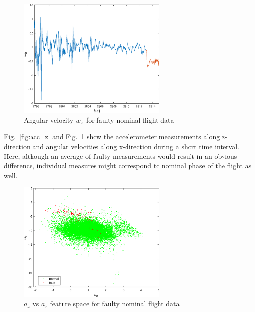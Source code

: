 \begin{figure}
\begin{center}
\includegraphics[width=0.65\textwidth]{figures/gyro_x}    %
\caption{Angular velocity $w_x$  for faulty nominal flight data} 
\label{fig:gyro_x}
\end{center}
\end{figure}

Fig.~\ref{fig:acc_z} and Fig.~\ref{fig:gyro_x} show the accelerometer measurements along z-direction and angular velocities along x-direction during a short time interval. 
Here, although an average of faulty measurements would result in an obvious difference, individual measures might correspond to nominal phase of the flight as well.

\begin{figure}
\begin{center}
\includegraphics[width=0.65\textwidth]{figures/feat1vsfeat3FaultStuck}    %
\caption{$a_x$ vs $a_z$ feature space for faulty nominal flight data} 
\label{fig:feat1vsfeat3FaultStuck}
\end{center}
\end{figure}

